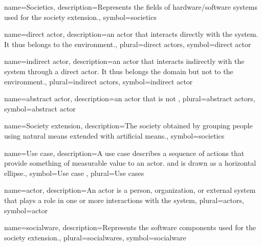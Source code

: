 {name=Societics,
description={Represents the fields of hardware/software
systems used for the society extension.},
symbol=societics
}

{name=direct actor,
description={an actor that interacts directly with the system. It thus belongs to the environment.},
plural={direct actors},
symbol=direct actor
}

{name=indirect actor,
description={an actor that interacts indirectly with the system through a direct actor. It thus belongs the domain but not to the environment.},
plural=indirect actors,
symbol=indirect actor
}

{name=abstract actor,
description={an actor that is not },
plural=abstract actors,
symbol=abstract actor
}

{name=Society extension,
description={The society obtained by grouping people using natural means
extended with artificial means.},
symbol=societics
}

{name=Use case,
description={A use case describes a sequence of actions that provide something
of measurable value to an actor. and is drawn as a horizontal ellipse.},
symbol=Use case ,
plural=Use cases
}

{name=actor,
description={An actor is a person, organization, or external system that plays a role in one or more interactions with the system},
plural={actors},
symbol=actor
}

{name={socialware},
description={Represents the software 
components used for the society extension.},
plural={socialwares},
symbol=socialware
}


